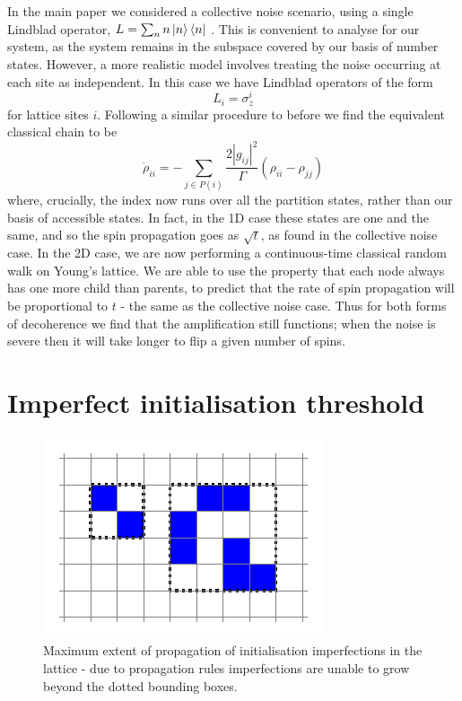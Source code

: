 In the main paper we considered a collective noise scenario, using a single Lindblad operator, $
L=\sum_{n}n\left\vert n\right\rangle\left\langle n\right\vert$ . This is convenient to analyse for our system, as the
system remains in the subspace covered by our basis of number
states. However, a more realistic model involves treating the noise
occurring at each site as independent. In this case we have Lindblad
operators of the form
\begin{equation}
L_i = \sigma_z^i
\end{equation}
for lattice sites $i$. Following a similar procedure to before we find
the equivalent classical chain to be
\begin{equation}
\dot{\rho}_{ii}=-\sum_{j\in
  P(i)}\frac{2|g_{ij}|^{2}}{\Gamma}\left(\rho_{ii}-\rho_{jj}\right)
\label{qmat}
\end{equation}
where, crucially, the index now runs over all the partition states,
rather than our basis of accessible states. In fact, in the
1D case these states are one and the same, and so the
spin propagation goes as $\sqrt{t}$, as found in the collective noise
case. In the 2D case, we are now performing a
continuous-time classical random walk on Young's lattice. We are able
to use the property that each node always has one more child than
parents, to predict that the rate of spin propagation will be proportional to $t$ - the same as the collective noise case.
Thus for both forms of decoherence we find that the amplification still functions; when the noise is severe then it will take longer to flip a given number of spins.

\section{Imperfect initialisation threshold}

\begin{figure}
  \begin{center}
  \includegraphics[scale=0.6]{assets/impurity}
\end{center}
  \caption{Maximum extent of propagation of initialisation
    imperfections in the lattice - due to propagation rules
    imperfections are unable to grow beyond the dotted bounding boxes. }
  \label{impurities}
\end{figure}

